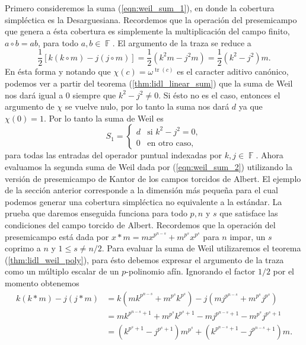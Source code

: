 \documentclass[a4paper,11pt]{report}
\DeclareMathOperator{\F}{\mathbb{F}}
\DeclareMathOperator{\tr}{tr}
\begin{document}
  Primero consideremos la suma (\ref{eqn:weil_sum_1}), en
  donde la cobertura simpléctica es la Desarguesiana.
  Recordemos que la operación del presemicampo que genera a
  ésta cobertura es simplemente la multiplicación del campo
  finito, $a \circ b = ab$, para todo $a,b \in \F$. El
  argumento de la traza se reduce a
  \begin{equation}
    \frac{1}{2} [k(k\circ m) - j(j\circ m)]
    = \frac{1}{2} \left( k^2m - j^2m \right) 
    = \frac{1}{2} \left( k^2 - j^2 \right) m.
  \end{equation} 
  En ésta forma y notando que $\chi(c) = \omega^{\tr(c)}$ es
  el caracter aditivo canónico, podemos ver a partir del
  teorema (\ref{thm:lidl_linear_sum}) que la suma de Weil
  nos dará igual a $0$ siempre que $k^2 - j^2 \neq 0$. Si
  ésto no es el caso, entonces el argumento de $\chi$ se
  vuelve nulo, por lo tanto la suma nos dará $d$ ya que
  $\chi(0) = 1$. Por lo tanto la suma de Weil es
  \begin{equation}
    S_1
    = \begin{cases}
      d & \text{si } k^2 - j^2 = 0, \\
      0 & \text{en otro caso},
    \end{cases}
  \end{equation}
  para todas las entradas del operador puntual indexadas por
  $k, j \in \F$. Ahora evaluamos la segunda suma de Weil
  dada por (\ref{eqn:weil_sum_2}) utilizando la versión de
  presemicampo de Kantor de los campos torcidos de Albert.
  El ejemplo de la sección anterior corresponde a la
  dimensión más pequeña para el cual podemos generar una
  cobertura simpléctica no equivalente a la estándar. La
  prueba que daremos enseguida funciona para todo $p, n$ y
  $s$ que satisface las condiciones del campo torcido de
  Albert.  Recordemos que la operación del presemicampo está
  dada por $x * m = mx^{p^{n-s}} + m^{p^{s}}x^{p^{s}}$ para
  $n$ impar, un $s$ coprimo a $n$ y $1 \leq s \neq n / 2$.
  Para evaluar la suma de Weil utilizaremos el teorema
  (\ref{thm:lidl_weil_poly}), para ésto debemos expresar el
  argumento de la traza como un múltiplo escalar de un
  $p$-polinomio afín. Ignorando el factor $1 / 2$ por el
  momento obtenemos
  \begin{align}
    k(k*m) - j(j*m)
    &= k \left( mk^{p^{n-s}} + m^{p^{s}}k^{p^{s}} \right) 
    - j\left( mj^{p^{n-s}} + m^{p^{s}}j^{p^{s}} \right) \\
    &= m k^{p^{n-s}+1} + m^{p^{s}}k^{p^{s}+1} - m
    j^{p^{n-s}+1} - m^{p^{s}}j^{p^{s}+1} \\
    &= \left( k^{p^{s}+1} - j^{p^{s}+1} \right) m^{p^{s}} 
    + \left( k^{p^{n-s}+1} - j^{p^{n-s}+1} \right) m.
    \label{eqn:p_poly_albert}
  \end{align}
\end{document}
